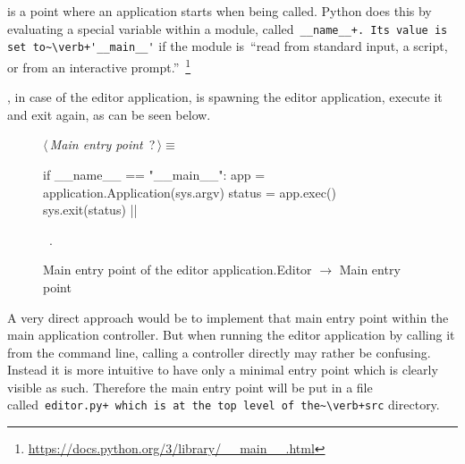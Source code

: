 \documentclass[%
    a4paper,    %
    justified,  %
    nobib,      %
    openany     %
]{tufte-book}
\begin{document}
 is a point where an application starts when being
called. Python does this by evaluating a special variable within a module,
called~\verb=__name__+. Its value is set to~\verb+'__main__'= if the module
is~\enquote{read from standard input, a script, or from an interactive
prompt.}~\footnote{\url{https://docs.python.org/3/library/__main__.html}}

, in case of the editor
application, is spawning the editor application, execute it and exit again, as
can be seen below.

\begin{figure}[h]
  \begin{flushleft} \small
\begin{minipage}{\linewidth}\label{scrap11}\raggedright\small
{} $\langle\,${\itshape Main entry point}\nobreak\ {\footnotesize {?}}$\,\rangle\equiv$
\vspace{-1ex}
\begin{pythoncode}
if __name__ == "__main__":
    app = application.Application(sys.argv)
    status = app.exec()
    sys.exit(status)
  |\NWsep|
\end{pythoncode}
\vspace{1.5ex}
\footnotesize
\begin{list}{}{\setlength{\itemsep}{-\parsep}\setlength{\itemindent}{-\leftmargin}}
\item \NWtxtMacroRefIn\ .

\item{}
\end{list}
\end{minipage}\vspace{4ex}
\end{flushleft}
\caption{Main entry point of the editor application.\newline{}\newline{}Editor
    $\rightarrow$ Main entry point}
  \label{editor:lst:main}
\end{figure}

 A very direct approach
would be to implement that main entry point within the main application
controller. But when running the editor application by calling it from the
command line, calling a controller directly may rather be confusing. Instead it
is more intuitive to have only a minimal entry point which is clearly visible as
such. Therefore the main entry point will be put in a file
called~\verb=editor.py+ which is at the top level of the~\verb+src= directory.
\end{document}
